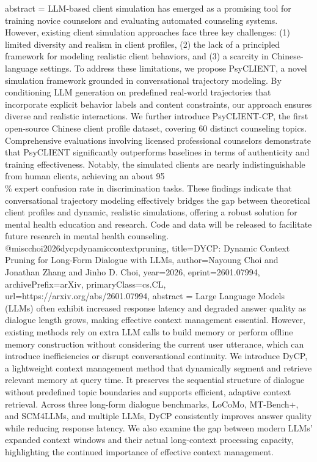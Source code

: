{      abstract = {LLM-based client simulation has emerged as a promising tool for training novice counselors and evaluating automated counseling systems. However, existing client simulation approaches face three key challenges: (1) limited diversity and realism in client profiles, (2) the lack of a principled framework for modeling realistic client behaviors, and (3) a scarcity in Chinese-language settings. To address these limitations, we propose PsyCLIENT, a novel simulation framework grounded in conversational trajectory modeling. By conditioning LLM generation on predefined real-world trajectories that incorporate explicit behavior labels and content constraints, our approach ensures diverse and realistic interactions. We further introduce PsyCLIENT-CP, the first open-source Chinese client profile dataset, covering 60 distinct counseling topics. Comprehensive evaluations involving licensed professional counselors demonstrate that PsyCLIENT significantly outperforms baselines in terms of authenticity and training effectiveness. Notably, the simulated clients are nearly indistinguishable from human clients, achieving an about 95\\\% expert confusion rate in discrimination tasks. These findings indicate that conversational trajectory modeling effectively bridges the gap between theoretical client profiles and dynamic, realistic simulations, offering a robust solution for mental health education and research. Code and data will be released to facilitate future research in mental health counseling.}
}@misc{choi2026dycpdynamiccontextpruning,
      title={DYCP: Dynamic Context Pruning for Long-Form Dialogue with LLMs}, 
      author={Nayoung Choi and Jonathan Zhang and Jinho D. Choi},
      year={2026},
      eprint={2601.07994},
      archivePrefix={arXiv},
      primaryClass={cs.CL},
      url={https://arxiv.org/abs/2601.07994},
      abstract = {Large Language Models (LLMs) often exhibit increased response latency and degraded answer quality as dialogue length grows, making effective context management essential. However, existing methods rely on extra LLM calls to build memory or perform offline memory construction without considering the current user utterance, which can introduce inefficiencies or disrupt conversational continuity. We introduce DyCP, a lightweight context management method that dynamically segment and retrieve relevant memory at query time. It preserves the sequential structure of dialogue without predefined topic boundaries and supports efficient, adaptive context retrieval. Across three long-form dialogue benchmarks, LoCoMo, MT-Bench+, and SCM4LLMs, and multiple LLMs, DyCP consistently improves answer quality while reducing response latency. We also examine the gap between modern LLMs' expanded context windows and their actual long-context processing capacity, highlighting the continued importance of effective context management.}
}
